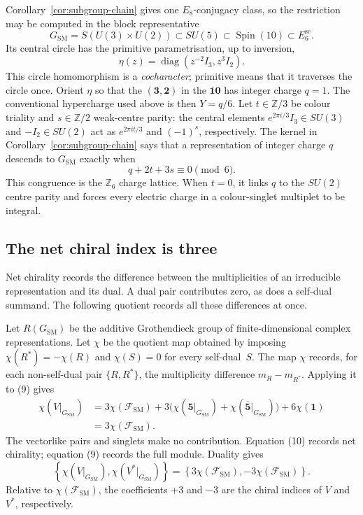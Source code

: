 \documentclass[11pt]{article}
\theoremstyle{remark}
\newcommand{\Ksm}{G_{\mathrm{SM}}}
\begin{document}
Corollary~\ref{cor:subgroup-chain} gives one \(E_8\)-conjugacy class,
so the restriction may be computed in the block representative
\[
 \Ksm=S(U(3)\times U(2))
 \subset SU(5)\subset\operatorname{Spin}(10)\subset E_6^{\mathrm{sc}}.
\]
Its central circle has the primitive parametrisation, up to inversion,
\[
 \eta(z)=\operatorname{diag}(z^{-2}I_3,z^3I_2).
\]
This circle homomorphism is a \emph{cocharacter}; primitive means that it
traverses the circle once. Orient \(\eta\) so that the
\((\mathbf3,\mathbf2)\) in the \(\mathbf{10}\) has integer charge \(q=1\).
The conventional hypercharge used above is then \(Y=q/6\).
Let \(t\in\mathbb Z/3\) be colour triality and \(s\in\mathbb Z/2\)
weak-centre parity: the central elements
\(e^{2\pi i/3}I_3\in SU(3)\) and \(-I_2\in SU(2)\) act as
\(e^{2\pi it/3}\) and \((-1)^s\), respectively. The kernel in
Corollary~\ref{cor:subgroup-chain} says that a representation of integer
charge \(q\) descends to \(\Ksm\) exactly when
\[
 q+2t+3s\equiv0\pmod6.
\]
This congruence is the \(\mathbb Z_6\) charge lattice. When \(t=0\), it
links \(q\) to the \(SU(2)\) centre parity and forces every electric charge
in a colour-singlet multiplet to be integral.

\subsection{The net chiral index is three}

Net chirality records the difference between the multiplicities of an
irreducible representation and its dual. A dual pair contributes zero,
as does a self-dual summand. The following quotient records all these
differences at once.

Let \(R(\Ksm)\) be the additive Grothendieck group of finite-dimensional
complex representations. Let \(\chi\) be the quotient map obtained by
imposing
\(\chi(R^*)=-\chi(R)\) and \(\chi(S)=0\) for every self-dual~\(S\).
The map \(\chi\) records, for each non-self-dual pair
\(\{R,R^*\}\), the multiplicity difference \(m_R-m_{R^*}\). Applying
it to (9) gives
\[
\begin{aligned}
 \chi\!\left(V|_{\Ksm}\right)
 &=3\chi(\mathcal F_{\mathrm{SM}})
   +3\bigl(\chi(\mathbf5|_{\Ksm})
           +\chi(\overline{\mathbf5}|_{\Ksm})\bigr)
   +6\chi(\mathbf1)\\
 &=\boxed{3\chi(\mathcal F_{\mathrm{SM}})}.
\end{aligned}                                                     \tag{10}
\]
The vectorlike pairs and singlets make no contribution. Equation (10)
records net chirality; equation (9) records the full module. Duality gives
\[
 \left\{\chi\!\left(V|_{\Ksm}\right),
 \chi\!\left(V^*|_{\Ksm}\right)\right\}
 =\left\{3\chi(\mathcal F_{\mathrm{SM}}),
          -3\chi(\mathcal F_{\mathrm{SM}})\right\}.
\]
Relative to \(\chi(\mathcal F_{\mathrm{SM}})\), the coefficients \(+3\) and
\(-3\) are the chiral indices of \(V\) and \(V^*\), respectively.
\end{document}
